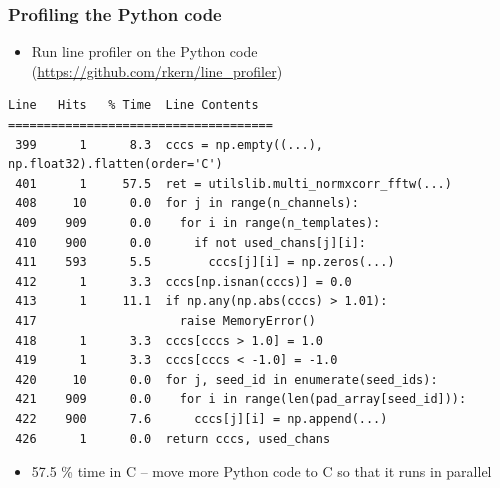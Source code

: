 \documentclass[aspectratio=169]{beamer}
\begin{document}
\begin{frame}[fragile]
    \frametitle{Profiling the Python code}
    
    
    \small{
        \begin{itemize}
          \item Run line profiler on the Python code (\url{https://github.com/rkern/line_profiler})
        \end{itemize}
    }
    
    \tiny{
    	\begin{verbatim}
Line   Hits   % Time  Line Contents
=====================================
 399      1      8.3  cccs = np.empty((...), np.float32).flatten(order='C')
 401      1     57.5  ret = utilslib.multi_normxcorr_fftw(...)
 408     10      0.0  for j in range(n_channels):
 409    909      0.0    for i in range(n_templates):
 410    900      0.0      if not used_chans[j][i]:
 411    593      5.5        cccs[j][i] = np.zeros(...)
 412      1      3.3  cccs[np.isnan(cccs)] = 0.0
 413      1     11.1  if np.any(np.abs(cccs) > 1.01):
 417                    raise MemoryError()
 418      1      3.3  cccs[cccs > 1.0] = 1.0
 419      1      3.3  cccs[cccs < -1.0] = -1.0
 420     10      0.0  for j, seed_id in enumerate(seed_ids):
 421    909      0.0    for i in range(len(pad_array[seed_id])):
 422    900      7.6      cccs[j][i] = np.append(...)
 426      1      0.0  return cccs, used_chans

        \end{verbatim}
    }
    
    \small{
        \begin{itemize}
            \item 57.5 \% time in C -- move more Python code to C so that it runs in parallel
        \end{itemize}
    }
    

\end{frame}
\end{document}
